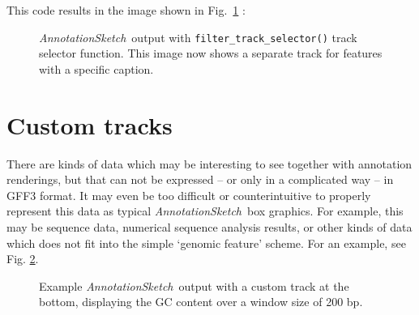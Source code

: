 \documentclass[a4paper]{scrreprt}
\newcommand{\AnnotationSketch}{\emph{AnnotationSketch}\ }
\begin{document}
This code results in the image shown in Fig.~\ref{tsexample3} :

\begin{figure}[ht]
\caption{\AnnotationSketch output with \texttt{filter\_track\_selector()} track selector function. This image now shows a separate track for features with a specific caption.}
\label{tsexample3}
\end{figure}

\section{Custom tracks}
There are kinds of data which may be interesting to see together with annotation renderings, but that can not be expressed -- or only in a complicated way -- in GFF3 format. It may even be too difficult or counterintuitive to properly represent this data as typical \AnnotationSketch box graphics. For example, this may be sequence data, numerical sequence analysis results, or other kinds of data which does not fit into the simple ‘genomic feature’ scheme. For an example, see Fig. \ref{ctexample1}.

\begin{figure}[ht]
\caption{Example \AnnotationSketch output with a custom track at the bottom, displaying the GC content over a window size of 200 bp.}
\label{ctexample1}
\end{figure}
\end{document}

